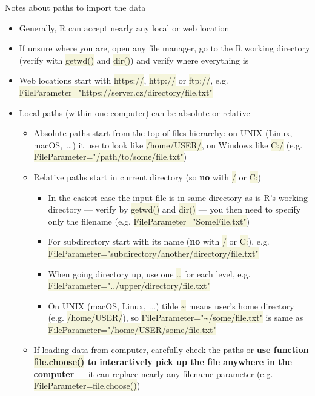 \documentclass[compress, ucs, xelatex, 11pt, xcolor=svgnames, aspectratio=169,
	hyperref={
		bookmarks=true,
		unicode=true,
		colorlinks=true,
		pdftitle={Molecular data in R},
		plainpages=false,
		pdfauthor={Vojtech Zeisek},
		pdfsubject={Course about phylogeny and evolution in R},
		pdfcreator={XeLaTeX},
		pdfkeywords={R, evolution, phylogeny, molecular data},
		linkcolor=Crimson, %
		anchorcolor=Magenta, %
		citecolor=Magenta, %
		filecolor=Magenta, %
		menucolor=Magenta, %
		urlcolor=DodgerBlue, %
		pdftex},
	url={hyphens, lowtilde} %
	]{beamer}
\renewcommand{\texttt}[1]{\colorbox{Beige}{{\ttfamily #1}}}
\begin{document}
\begin{frame}[allowframebreaks]{Notes about paths to import the data}
	\label{path}
	\begin{itemize}
		\item Generally, R can accept nearly any local or web location
		\item If unsure where you are, open any file manager, go to the R working directory (verify with \texttt{getwd()} and \texttt{dir()}) and verify where everything is
		\item Web locations start with \texttt{https://}, \texttt{http://} or \texttt{ftp://}, e.g. \texttt{FileParameter="https://server.cz/directory/file.txt"}
		\item Local paths (within one computer) can be absolute or relative
		\begin{itemize}
			\item Absolute paths start from the top of files hierarchy: on UNIX (Linux, macOS,~\ldots) it use to look like \texttt{/home/USER/}, on Windows like \texttt{C:/} (e.g. \texttt{FileParameter="/path/to/some/file.txt"})
			\item Relative paths start in current directory (so \textbf{no} with \texttt{/} or \texttt{C:})
			\begin{itemize}
	\item In the easiest case the input file is in same directory as is R's working directory --- verify by \texttt{getwd()} and \texttt{dir()} --- you then need to specify only the filename (e.g. \texttt{FileParameter="SomeFile.txt"})
	\item For subdirectory start with its name (\textbf{no} with \texttt{/} or \texttt{C:}), e.g. \texttt{FileParameter="subdirectory/another/directory/file.txt"}
	\item When going directory up, use one \texttt{..} for each level, e.g. \texttt{FileParameter="../upper/directory/file.txt"}
	\item On UNIX (macOS, Linux,~\ldots) tilde \texttt{\textasciitilde} means user's home directory (e.g. \texttt{/home/USER/}), so \texttt{FileParameter="\textasciitilde/some/file.txt"} is same as \texttt{FileParameter="/home/USER/some/file.txt"}
			\end{itemize}
			\item If loading data from computer, carefully check the paths or \textbf{use function \texttt{file.choose()} to interactively pick up the file anywhere in the computer} --- it can replace nearly any filename parameter (e.g. \alert{\texttt{FileParameter=file.choose()}})

\end{itemize}
\end{itemize}
\end{frame}
\end{document}

